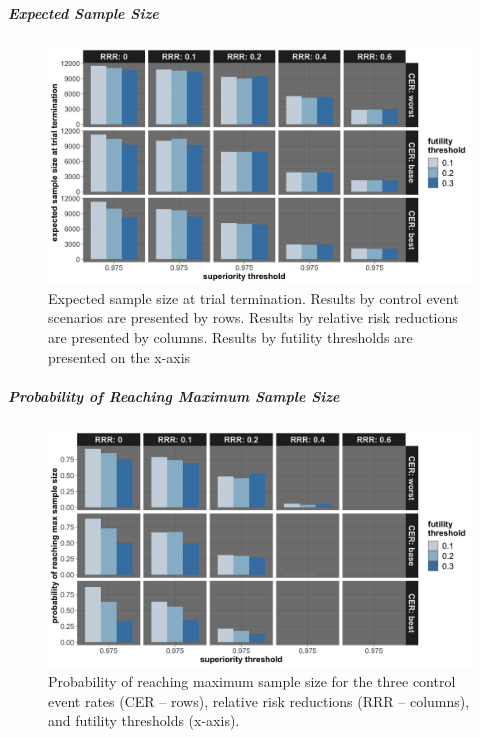 \documentclass[]{article}
\let\oldsubparagraph\subparagraph
\renewcommand{\subparagraph}[1]{\oldsubparagraph{#1}\mbox{}}
\begin{document}
\clearpage

\hypertarget{expected-sample-size-1}{%
\subparagraph{Expected Sample Size}\label{expected-sample-size-1}}

\begin{figure}
  \caption{Expected sample size at trial termination. Results by control event scenarios are presented by rows. Results
  by relative risk reductions are presented by columns. Results by futility thresholds are presented on the x-axis}
  \includegraphics{../p1_plots/batch_size_nb_2000/exp_sample_size_p1.png}
\end{figure}

\clearpage

\hypertarget{probability-of-reaching-maximum-sample-size-1}{%
\subparagraph{Probability of Reaching Maximum Sample
Size}\label{probability-of-reaching-maximum-sample-size-1}}

\begin{figure}
  \caption{Probability of reaching maximum sample size for the three control event rates (CER – rows), relative
  risk reductions (RRR – columns), and futility thresholds (x-axis).}
  \includegraphics{../p1_plots/batch_size_nb_2000/prob_reach_max_size_p1.png}
\end{figure}
\end{document}
